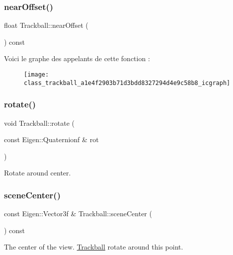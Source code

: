 \subsubsection{\texorpdfstring{near\+Offset()}{nearOffset()}}
{\footnotesize\ttfamily float Trackball\+::near\+Offset (\begin{DoxyParamCaption}{ }\end{DoxyParamCaption}) const}

Voici le graphe des appelants de cette fonction \+:\nopagebreak
\begin{figure}[H]
\begin{center}
\leavevmode
\texttt{[image: class\_trackball\_a1e4f2903b71d3bdd8327294d4e9c58b8\_icgraph]}
\end{center}
\end{figure}
\mbox{\label{class_trackball_aa0dee57906be9ccd12183d0d6e820c3d}} 
\subsubsection{\texorpdfstring{rotate()}{rotate()}}
{\footnotesize\ttfamily void Trackball\+::rotate (\begin{DoxyParamCaption}\item[{const Eigen\+::\+Quaternionf \&}]{rot }\end{DoxyParamCaption})}



Rotate around {\ttfamily center}. 

\mbox{\label{class_trackball_ad658224ce2f6a47a1f607852c887654b}} 
\subsubsection{\texorpdfstring{scene\+Center()}{sceneCenter()}}
{\footnotesize\ttfamily const Eigen\+::\+Vector3f \& Trackball\+::scene\+Center (\begin{DoxyParamCaption}{ }\end{DoxyParamCaption}) const}



The center of the view. \hyperlink{class_trackball}{Trackball} rotate around this point. 

